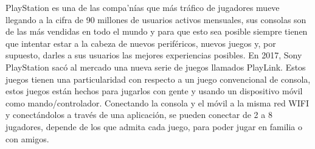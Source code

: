 PlayStation es una de las compa'n\'ias que m\'as tr\'afico de jugadores mueve llegando a la cifra de 90 millones de usuarios activos mensuales, sus consolas son de las m\'as vendidas en todo el mundo y para que esto sea posible siempre tienen que intentar estar a la cabeza de nuevos perif\'ericos, nuevos juegos y, por supuesto, darles a sus usuarios las mejores experiencias posibles. En 2017, Sony PlayStation sac\'o al mercado una nueva serie de juegos llamados PlayLink. Estos juegos tienen una particularidad con respecto a un juego convencional de consola, estos juegos est\'an hechos para jugarlos con gente y usando un dispositivo m\'ovil como mando/controlador. Conectando la consola y el m\'ovil a la misma red WIFI y conect\'andolos a trav\'es de una aplicaci\'on, se pueden conectar de 2 a 8 jugadores, depende de los que admita cada juego, para poder jugar en familia o con amigos.



